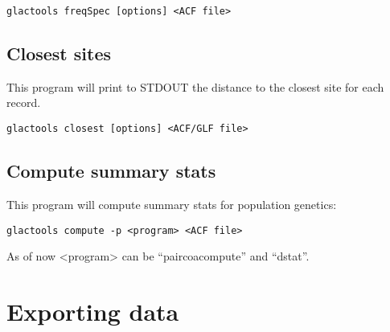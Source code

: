 \documentclass[a4paper]{article}
\begin{document}
\begin{lstlisting}
glactools freqSpec [options] <ACF file>
\end{lstlisting}

\subsection{Closest sites}

\noindent This program will print to STDOUT the distance to the closest site for each record.

\begin{lstlisting}
glactools closest [options] <ACF/GLF file>
\end{lstlisting}






\subsection{Compute summary stats}

\noindent This program will compute summary stats for population genetics:

\begin{lstlisting}
glactools compute -p <program> <ACF file>
\end{lstlisting}

As of now <program> can be ``paircoacompute'' and ``dstat''.
























\newpage

\section{Exporting data}
\end{document}
